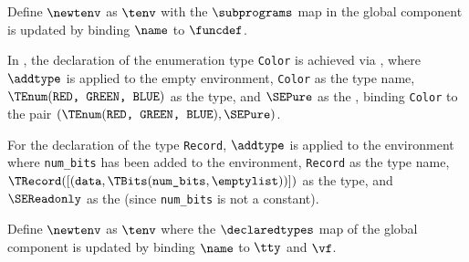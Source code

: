 \ProseParagraph
Define $\newtenv$ as $\tenv$ with the $\subprograms$ map in the global component is updated by
binding $\name$ to $\funcdef$.

\FormallyParagraph
\begin{mathpar}
\end{mathpar}


In , the declaration of the enumeration type \verb|Color|
is achieved via , where
$\addtype$ is applied to
the empty environment, \verb|Color| as the type name,
$\TEnum(\texttt{RED, GREEN, BLUE})$ as the type, and $\SEPure$ as the \purity{},
binding \verb|Color| to the pair $(\TEnum(\texttt{RED, GREEN, BLUE}), \SEPure)$.

For the declaration of the type \verb|Record|,
$\addtype$ is applied to the environment where \verb|num_bits| has been added to the environment,
\verb|Record| as the type name,\\
$\TRecord([(\texttt{data},\TBits(\texttt{num\_bits}, \emptylist))])$ as the type,
and $\SEReadonly$ as the \purity{} (since \verb|num_bits| is not a constant).

\ProseParagraph
Define $\newtenv$ as $\tenv$ where the $\declaredtypes$ map of the global component is updated
by binding $\name$ to $\tty$ and $\vf$.

\FormallyParagraph
\begin{mathpar}
\end{mathpar}

